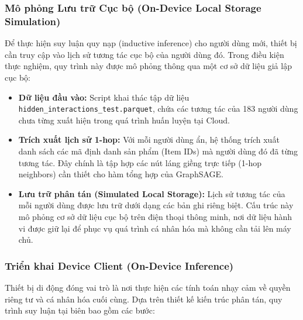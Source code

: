 \subsubsection{Mô phỏng Lưu trữ Cục bộ (On-Device Local Storage Simulation)}

Để thực hiện suy luận quy nạp (inductive inference) cho người dùng mới, thiết bị cần truy cập vào lịch sử tương tác cục bộ của người dùng đó. Trong điều kiện thực nghiệm, quy trình này được mô phỏng thông qua một cơ sở dữ liệu giả lập cục bộ:

\begin{itemize}
    \item \textbf{Dữ liệu đầu vào:} Script khai thác tập dữ liệu \texttt{hidden\_interactions\_test.parquet}, chứa các tương tác của 183 người dùng chưa từng xuất hiện trong quá trình huấn luyện tại Cloud.
    \item \textbf{Trích xuất lịch sử 1-hop:} Với mỗi người dùng ẩn, hệ thống trích xuất danh sách các mã định danh sản phẩm (Item IDs) mà người dùng đó đã từng tương tác. Đây chính là tập hợp các nút láng giềng trực tiếp (1-hop neighbors) cần thiết cho hàm tổng hợp của GraphSAGE.
    \item \textbf{Lưu trữ phân tán (Simulated Local Storage):} Lịch sử tương tác của mỗi người dùng được lưu trữ dưới dạng các bản ghi riêng biệt. Cấu trúc này mô phỏng cơ sở dữ liệu cục bộ trên điện thoại thông minh, nơi dữ liệu hành vi được giữ lại để phục vụ quá trình cá nhân hóa mà không cần tải lên máy chủ.
\end{itemize}

\subsubsection{Triển khai Device Client (On-Device Inference)}

Thiết bị di động đóng vai trò là nơi thực hiện các tính toán nhạy cảm về quyền riêng tư và cá nhân hóa cuối cùng. Dựa trên thiết kế kiến trúc phân tán, quy trình suy luận tại biên bao gồm các bước:

